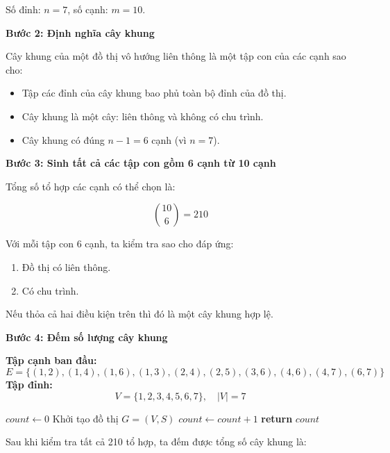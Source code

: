 \documentclass{article}
\begin{document}
	Số đỉnh: \( n = 7 \), số cạnh: \( m = 10 \).
	
	\vspace{1em}
	\textbf{Bước 2: Định nghĩa cây khung}
	
	Cây khung của một đồ thị vô hướng liên thông là một tập con của các cạnh sao cho:
	
	\begin{itemize}
		\item Tập các đỉnh của cây khung bao phủ toàn bộ đỉnh của đồ thị.
		\item Cây khung là một cây: liên thông và không có chu trình.
		\item Cây khung có đúng \( n - 1 = 6 \) cạnh (vì \( n = 7 \)).
	\end{itemize}
	
	\vspace{1em}
	\textbf{Bước 3: Sinh tất cả các tập con gồm 6 cạnh từ 10 cạnh}
	
	Tổng số tổ hợp các cạnh có thể chọn là:
	
	\[
	\binom{10}{6} = 210
	\]
	
	Với mỗi tập con 6 cạnh, ta kiểm tra sao cho đáp ứng:
	\begin{enumerate}
		\item Đồ thị có liên thông.
		\item Có chu trình.
	\end{enumerate}
	
	Nếu thỏa cả hai điều kiện trên thì đó là một cây khung hợp lệ.
	
	\vspace{1em}
	\textbf{Bước 4: Đếm số lượng cây khung}
	
	\textbf{Tập cạnh ban đầu:}
	\[
	E = \{
	(1, 2), (1, 4), (1, 6), (1, 3),
	(2, 4), (2, 5),
	(3, 6), (4, 6), (4, 7), (6, 7)
	\}
	\]
	\textbf{Tập đỉnh:}
	\[
	V = \{1, 2, 3, 4, 5, 6, 7\}, \quad |V| = 7
	\]
	
	\begin{algorithm}[H]
		\begin{algorithmic}[1]
			\State $count \gets 0$
			 
			\State Khởi tạo đồ thị $G = (V, S)$
			\State $count \gets count + 1$
			\EndIf
			\EndFor
			\State \textbf{return} $count$
		\end{algorithmic}
	\end{algorithm}
	
	Sau khi kiểm tra tất cả 210 tổ hợp, ta đếm được tổng số cây khung là:
	
\end{document}
